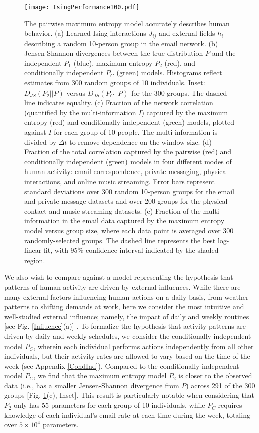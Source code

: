 \documentclass[aps,reprint,superscriptaddress,amsmath,amssymb,longbibliography]{revtex4-1}
\begin{document}
\begin{figure}
\texttt{[image: IsingPerformance100.pdf]}
\caption{\label{Ising} The pairwise maximum entropy model accurately describes human behavior. (a) Learned Ising interactions $J_{ij}$ and external fields $h_i$ describing a random 10-person group in the email network. (b) Jensen-Shannon divergences between the true distribution $P$ and the independent $P_1$ (blue), maximum entropy $P_2$ (red), and conditionally independent $P_C$ (green) models. Histograms reflect estimates from 300 random groups of 10 individuals. Inset: $D_{JS}(P_2||P)$ versus $D_{JS}(P_C||P)$ for the 300 groups. The dashed line indicates equality. (c) Fraction of the network correlation (quantified by the multi-information $I$) captured by the maximum entropy (red) and conditionally independent (green) models, plotted against $I$ for each group of 10 people. The multi-information is divided by $\Delta t$ to remove dependence on the window size. (d) Fraction of the total correlation captured by the pairwise (red) and conditionally independent (green) models in four different modes of human activity: email correspondence, private messaging, physical interactions, and online music streaming. Error bars represent standard deviations over 300 random 10-person groups for the email and private message datasets and over 200 groups for the physical contact and music streaming datasets. (e) Fraction of the multi-information in the email data captured by the maximum entropy model versus group size, where each data point is averaged over 300 randomly-selected groups. The dashed line represents the best log-linear fit, with 95\% confidence interval indicated by the shaded region.}
\end{figure}

We also wish to compare against a model representing the hypothesis that patterns of human activity are driven by external influences. While there are many external factors influencing human actions on a daily basis, from weather patterns to shifting demands at work, here we consider the most intuitive and well-studied external influence; namely, the impact of daily and weekly routines [see Fig. \ref{Influence}(a)] \cite{Peng-01,Crane-01,Candia-01,Malmgren-02}. To formalize the hypothesis that activity patterns are driven by daily and weekly schedules, we consider the conditionally independent model $P_C$, wherein each individual performs actions independently from all other individuals, but their activity rates are allowed to vary based on the time of the week \cite{Schneidman-01, Barlow-01} (see Appendix \ref{CondInd}). Compared to the conditionally independent model $P_C$, we find that the maximum entropy model $P_2$ is closer to the observed data (i.e., has a smaller Jensen-Shannon divergence from $P$) across 291 of the 300 groups [Fig. \ref{Ising}(c), Inset]. This result is particularly notable when considering that $P_2$ only has 55 parameters for each group of 10 individuals, while $P_C$ requires knowledge of each individual's email rate at each time during the week, totaling over $5\times 10^4$ parameters.
\end{document}
